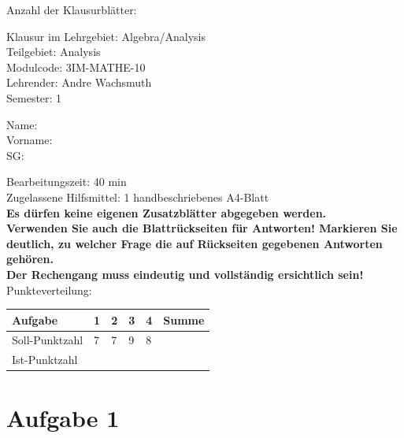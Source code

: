 \documentclass[12pt]{article}
\begin{document}
\thispagestyle{firstpage}

\begin{flushright}
Anzahl der Klausurblätter: \pageref*{LastTask}
\end{flushright}

Klausur im Lehrgebiet: Algebra/Analysis\\

Teilgebiet: Analysis \\

Modulcode: 3IM-MATHE-10 \\

Lehrender: Andre Wachsmuth \\

Semester: 1 \\

\begin{vwcol}[widths={0.4,0.4,0.2},sep=0cm, justify=flush,rule=0pt,indent=4em]
Name:\\
Vorname:\\
SG:
\end{vwcol}

\bigskip
\bigskip
\bigskip
Bearbeitungszeit: 40 min \\

Zugelassene Hilfsmittel: 1 handbeschriebenes A4-Blatt \\

\textbf{Es dürfen keine eigenen Zusatzblätter abgegeben werden.} \\

\textbf{Verwenden Sie auch die Blattrückseiten für Antworten! Markieren Sie deutlich, zu welcher Frage die auf Rückseiten gegebenen Antworten gehören.} \\

\textbf {Der Rechengang muss eindeutig und vollständig ersichtlich sein!} \\

Punkteverteilung:

\bigskip

\begin{tabularx}{\textwidth}{l|Y|Y|Y|Y|Y}
Aufgabe        & 1 & 2 & 3 & 4  & Summe \\ [1ex] \hline
Soll-Punktzahl & 7 & 7 & 9 & 8  &       \\ [3ex]
Ist-Punktzahl  &   &   &   &    &       \\ [3ex]
\end{tabularx}

\newpage
\section* {Aufgabe 1}
\end{document}
